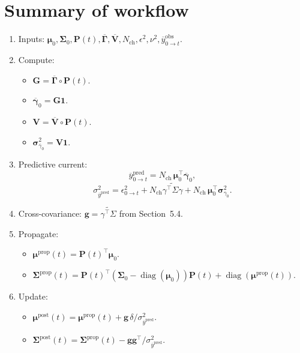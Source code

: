 \documentclass[11pt]{article}
\begin{document}
\section{Summary of workflow}

\begin{enumerate}
  \item Inputs:
  \(\boldsymbol{\mu}_0,\boldsymbol{\Sigma}_0, \mathbf{P}(t),
   \overline{\mathbf{\Gamma}}, \overline{\mathbf{V}},
   N_{\text{ch}}, \epsilon^2, \nu^2,
   \overline{y}^{\text{obs}}_{0\to t}\).

  \item Compute:
  \begin{itemize}
    \item \(\mathbf{G}=\overline{\mathbf{\Gamma}}\circ\mathbf{P}(t)\).
    \item \(\overline{\boldsymbol{\gamma}}_0=\mathbf{G}\mathbf{1}\).
    \item \(\mathbf{V}=\overline{\mathbf{V}}\circ\mathbf{P}(t)\).
    \item \(\boldsymbol{\sigma}^2_{\overline{\gamma}_0}=\mathbf{V}\mathbf{1}\).
  \end{itemize}

  \item Predictive current:
  \[
    \overline{y}^{\text{pred}}_{0\to t}
    =
    N_{\text{ch}}\,
    \boldsymbol{\mu}_0^\top\overline{\boldsymbol{\gamma}}_0,
  \]
  \[
    \sigma^2_{\overline{y}^{\text{pred}}}
    =
    \epsilon^2_{0\to t}
    +
    N_{\text{ch}}\widetilde{\gamma^\top\Sigma\gamma}
    +
    N_{\text{ch}}\,
    \boldsymbol{\mu}_0^\top\boldsymbol{\sigma}^2_{\overline{\gamma}_0}.
  \]

  \item Cross-covariance:
  \(\mathbf{g}=\widetilde{\gamma^\top\Sigma}\) from Section~5.4.

  \item Propagate:
  \begin{itemize}
    \item \(\boldsymbol{\mu}^{\text{prop}}(t)=\mathbf{P}(t)^\top\boldsymbol{\mu}_0\).
    \item \(\boldsymbol{\Sigma}^{\text{prop}}(t)=\mathbf{P}(t)^\top(\boldsymbol{\Sigma}_0-\operatorname{diag}(\boldsymbol{\mu}_0))\mathbf{P}(t)+\operatorname{diag}(\boldsymbol{\mu}^{\text{prop}}(t))\).
  \end{itemize}

  \item Update:
  \begin{itemize}
    \item \(\boldsymbol{\mu}^{\text{post}}(t)=\boldsymbol{\mu}^{\text{prop}}(t)+\mathbf{g}\,\delta/\sigma^2_{\overline{y}^{\text{pred}}}\).
    \item \(\boldsymbol{\Sigma}^{\text{post}}(t)=\boldsymbol{\Sigma}^{\text{prop}}(t)-\mathbf{g}\mathbf{g}^\top/\sigma^2_{\overline{y}^{\text{pred}}}\).
  \end{itemize}
\end{enumerate}
\end{document}
